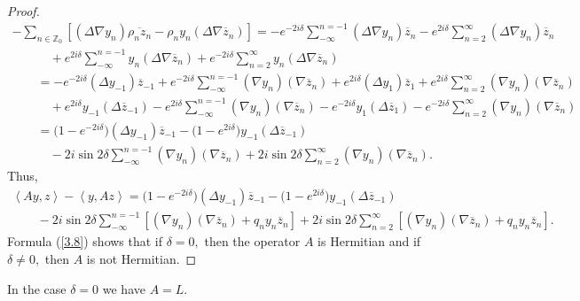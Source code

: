 \documentclass[pdftex]{sigma}
\numberwithin{equation}{section}
\begin{document}
\begin{proof}
\begin{gather*}
-\sum_{n\in
\mathbb{Z}
_{0}}[(\Delta \nabla y_{n})\overline{\rho _{n}z_{n}}-\rho _{n}y_{n}(\Delta
\nabla \overline{z}_{n})]
=-e^{-2i\delta }\sum_{-\infty }^{n=-1}(\Delta \nabla y_{n})\overline{z}%
_{n}-e^{2i\delta }\sum_{n=2}^{\infty }(\Delta \nabla y_{n})\overline{z}%
_{n}\\
\quad \qquad{}+e^{2i\delta }\sum_{-\infty }^{n=-1}y_{n}(\Delta \nabla \overline{z}%
_{n})+e^{-2i\delta }\sum_{n=2}^{\infty }y_{n}(\Delta \nabla \overline{z}_{n})
\\
\qquad{}=-e^{-2i\delta }(\Delta y_{-1})\overline{z}_{-1}+e^{-2i\delta }\sum_{-\infty
}^{n=-1}(\nabla y_{n})(\nabla \overline{z}_{n})+e^{2i\delta }(\Delta y_{1})%
\overline{z}_{1}+e^{2i\delta }\sum_{n=2}^{\infty }(\nabla y_{n})(\nabla
\overline{z}_{n})
\\
\qquad\quad{}+e^{2i\delta }y_{-1}(\Delta \overline{z}_{-1})-e^{2i\delta }\sum_{-\infty
}^{n=-1}(\nabla y_{n})(\nabla \overline{z}_{n})-e^{-2i\delta }y_{1}(\Delta
\overline{z}_{1})-e^{-2i\delta }\sum_{n=2}^{\infty }(\nabla y_{n})(\nabla
\overline{z}_{n})
\\
\qquad{}=\big(1-e^{-2i\delta }\big)(\Delta y_{-1})\overline{z}_{-1}-\big(1-e^{2i\delta
}\big)y_{-1}(\Delta \overline{z}_{-1})
\\
\quad\qquad{}-2i\sin 2\delta \sum_{-\infty }^{n=-1}(\nabla y_{n})(\nabla \overline{z}%
_{n})+2i\sin 2\delta \sum_{n=2}^{\infty }(\nabla y_{n})(\nabla \overline{z}%
_{n}).
\end{gather*}
Thus,%
\begin{gather}
\left\langle Ay,z\right\rangle -\left\langle y,Az\right\rangle
=\big(1-e^{-2i\delta }\big)(\Delta y_{-1})\overline{z}_{-1}-\big(1-e^{2i\delta
}\big)y_{-1}(\Delta \overline{z}_{-1})\nonumber
\\
\qquad{}
-2i\sin 2\delta \sum_{-\infty }^{n=-1}[(\nabla y_{n})(\nabla \overline{z}%
_{n})+q_{n}y_{n}\overline{z}_{n}]+2i\sin 2\delta \sum_{n=2}^{\infty
}[(\nabla y_{n})(\nabla \overline{z}_{n})+q_{n}y_{n}\overline{z}_{n}].\label{3.8}
\end{gather}%
Formula (\ref{3.8}) shows that if $\delta =0,$ then the operator $A$ is
Hermitian and if $\delta \neq 0,$ then $A$ is not Hermitian.
\end{proof}

\begin{remark}
In the case $\delta =0$ we have $A=L$.
\end{remark}
\end{document}
